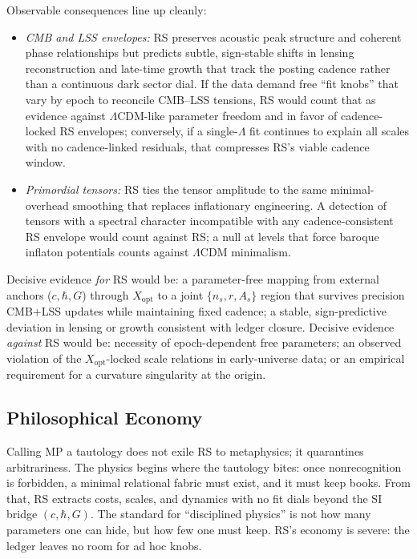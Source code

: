 \documentclass[11pt]{article}
\theoremstyle{definition}
\theoremstyle{remark}
\begin{document}
Observable consequences line up cleanly:
\begin{itemize}
  \item \emph{CMB and LSS envelopes:} RS preserves acoustic peak structure and coherent phase relationships but predicts subtle, sign-stable shifts in lensing reconstruction and late-time growth that track the posting cadence rather than a continuous dark sector dial. If the data demand free “fit knobs” that vary by epoch to reconcile CMB–LSS tensions, RS would count that as evidence against \(\Lambda\)CDM-like parameter freedom and in favor of cadence-locked RS envelopes; conversely, if a single-\(\Lambda\) fit continues to explain all scales with no cadence-linked residuals, that compresses RS’s viable cadence window.
  \item \emph{Primordial tensors:} RS ties the tensor amplitude to the same minimal-overhead smoothing that replaces inflationary engineering. A detection of tensors with a spectral character incompatible with any cadence-consistent RS envelope would count against RS; a null at levels that force baroque inflaton potentials counts against \(\Lambda\)CDM minimalism.
\end{itemize}
Decisive evidence \emph{for} RS would be: a parameter-free mapping from external anchors (\(c,\hbar,G\)) through \(X_{\mathrm{opt}}\) to a joint \(\{n_s,r,A_s\}\) region that survives precision CMB+LSS updates while maintaining fixed cadence; a stable, sign-predictive deviation in lensing or growth consistent with ledger closure. Decisive evidence \emph{against} RS would be: necessity of epoch-dependent free parameters; an observed violation of the \(X_{\mathrm{opt}}\)-locked scale relations in early-universe data; or an empirical requirement for a curvature singularity at the origin.

\subsection{Philosophical Economy}
Calling MP a tautology does not exile RS to metaphysics; it quarantines arbitrariness. The physics begins where the tautology bites: once nonrecognition is forbidden, a minimal relational fabric must exist, and it must keep books. From that, RS extracts costs, scales, and dynamics with no fit dials beyond the SI bridge \((c,\hbar,G)\). The standard for “disciplined physics” is not how many parameters one can hide, but how few one must keep. RS’s economy is severe: the ledger leaves no room for ad hoc knobs.
\end{document}
